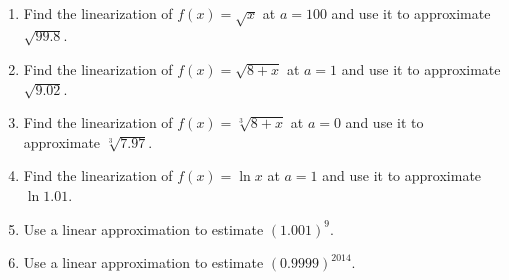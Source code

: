 ~\begin{enumerate}[ref={\fcProblemRef}]
\item Find the linearization of $f(x) = \sqrt{x}$ at $a = 100$ and use it to approximate
$\sqrt{99.8}$.



\item Find the linearization of $f(x)=\sqrt{8+x}$ at $a=1$ and use it to approximate $\sqrt{9.02}$.

\item Find the linearization of $f(x)=\sqrt[3]{8+x}$ at $a=0$ and use it to approximate $\sqrt[3] {7.97}$.

\item Find the linearization of $f(x)=\ln x$ at $a=1$ and use it to approximate $\ln 1.01$.

\item Use a linear approximation to estimate $(1.001)^9$. 

\item \label{problem-linearization-estimate0.9999power2014} Use a linear approximation to estimate $(0.9999)^{2014}$. 



\end{enumerate}
